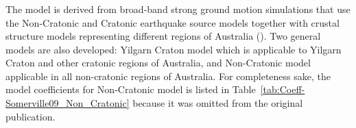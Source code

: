 \subsubsection{\citet{eqrm_Somerville09}}

The \citet{eqrm_Somerville09} model is derived from broad-band
strong ground motion simulations that use the Non-Cratonic and
Cratonic earthquake source models together with crustal structure
models representing different regions of Australia (\citet[Table
7-1]{eqrm_Somerville09}). Two general models are also developed:
Yilgarn Craton model which is applicable to Yilgarn Craton and other
cratonic regions of Australia, and Non-Cratonic model applicable in
all non-cratonic regions of Australia. For completeness sake, the
model coefficients for Non-Cratonic model is listed in
Table~\ref{tab:Coeff-Somerville09_Non_Cratonic} because it was
omitted from the original publication.


